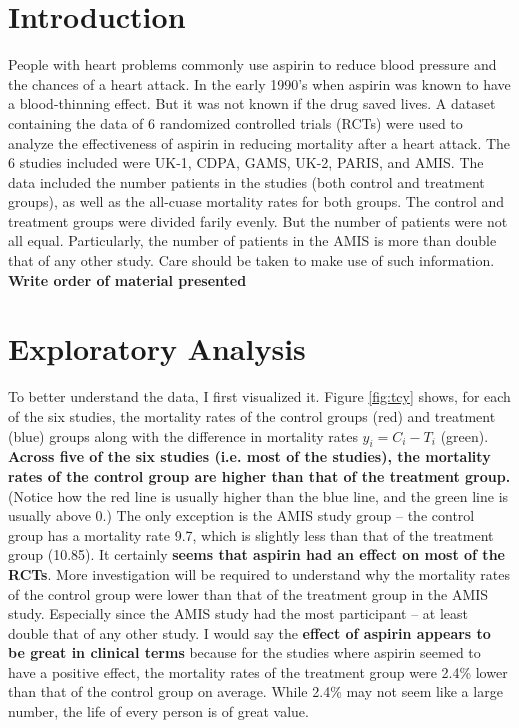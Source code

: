 \documentclass{../../tex_template/asaproc}
\begin{document}
\section{Introduction}
People with heart problems commonly use aspirin to reduce blood pressure and
the chances of a heart attack. In the early 1990's when aspirin was known to
have a blood-thinning effect. But it was not known if the drug saved lives.  A
dataset containing the data of 6 randomized controlled trials (RCTs) were used
to analyze the effectiveness of aspirin in reducing mortality after a heart
attack. The 6 studies included were UK-1, CDPA, GAMS, UK-2, PARIS, and AMIS.
The data included the number patients in the studies (both control and
treatment groups), as well as the all-cuase mortality rates for both groups.
The control and treatment groups were divided farily evenly. But the number
of patients were not all equal. Particularly, the number of patients in the AMIS 
is more than double that of any other study. Care should be taken to make
use of such information. \textbf{Write order of material presented}\\

\section{Exploratory Analysis}
To better understand the data, I first visualized it.  Figure \ref{fig:tcy}
shows, for each of the six studies, the mortality rates of the control groups
(red) and treatment (blue) groups along with the difference in mortality rates
$y_i = C_i-T_i$ (green).  \textbf{Across five of the six studies (i.e. most of
the studies), the mortality rates of the control group are higher than that of
the treatment group.} (Notice how the red line is usually higher than the blue
line, and the green line is usually above 0.) The only exception is the AMIS
study group -- the control group has a mortality rate 9.7, which is slightly
less than that of the treatment group (10.85).  It certainly \textbf{seems that
aspirin had an effect on most of the RCTs}. More investigation will be required
to understand why the mortality rates of the control group were lower than that
of the treatment group in the AMIS study. Especially since the AMIS study had
the most participant -- at least double that of any other study. I would 
say the \textbf{effect of aspirin appears to be great in clinical terms}
because for the studies where aspirin seemed to have a positive effect, the
mortality rates of the treatment group were 2.4\% lower than that of the
control group on average. While 2.4\% may not seem like a large number, 
the life of every person is of great value.\\
\end{document}
